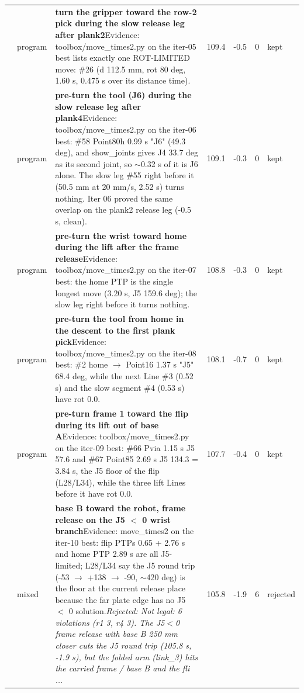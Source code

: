 {\begin{longtable}{>{\raggedleft}p{5mm} p{12mm} >{\raggedright}p{85mm} r r r p{14mm}}
6 & program & \textbf{turn the gripper toward the row-2 pick during the slow release leg after plank2}\newline Evidence: toolbox/move\_times2.py on the iter-05 best lists exactly one ROT-LIMITED move: \#26 (d 112.5 mm, rot 80 deg, 1.60 s, 0.475 s over its distance time). & 109.4 & -0.5 & 0 & kept \\
7 & program & \textbf{pre-turn the tool (J6) during the slow release leg after plank4}\newline Evidence: toolbox/move\_times2.py on the iter-06 best: \#58 Point80h 0.99 s "J6" (49.3 deg), and show\_joints gives J4 33.7 deg as its second joint, so $\sim$0.32 s of it is J6 alone. The slow leg \#55 right before it (50.5 mm at 20 mm/s, 2.52 s) turns nothing. Iter 06 proved the same overlap on the plank2 release leg (-0.5 s, clean). & 109.1 & -0.3 & 0 & kept \\
8 & program & \textbf{pre-turn the wrist toward home during the lift after the frame release}\newline Evidence: toolbox/move\_times2.py on the iter-07 best: the home PTP is the single longest move (3.20 s, J5 159.6 deg); the slow leg right before it turns nothing. & 108.8 & -0.3 & 0 & kept \\
9 & program & \textbf{pre-turn the tool from home in the descent to the first plank pick}\newline Evidence: toolbox/move\_times2.py on the iter-08 best: \#2 home $\to$ Point16 1.37 s "J5" 68.4 deg, while the next Line \#3 (0.52 s) and the slow segment \#4 (0.53 s) have rot 0.0. & 108.1 & -0.7 & 0 & kept \\
10 & program & \textbf{pre-turn frame 1 toward the flip during its lift out of base A}\newline Evidence: toolbox/move\_times2.py on the iter-09 best: \#66 Pvia 1.15 s J5 57.6 and \#67 Point85 2.69 s J5 134.3 = 3.84 s, the J5 floor of the flip (L28/L34), while the three lift Lines before it have rot 0.0. & 107.7 & -0.4 & 0 & kept \\
11 & mixed & \textbf{base B toward the robot, frame release on the J5 $<$ 0 wrist branch}\newline Evidence: move\_times2 on the iter-10 best: flip PTPs 0.65 + 2.76 s and home PTP 2.89 s are all J5-limited; L28/L34 say the J5 round trip (-53 $\to$ +138 $\to$ -90, $\sim$420 deg) is the floor at the current release place because the far plate edge has no J5 $<$ 0 solution.\newline \textit{Rejected: Not legal: 6 violations (r1 3, r4 3). The J5$<$0 frame release with base B 250 mm closer cuts the J5 round trip (105.8 s, -1.9 s), but the folded arm (link\_3) hits the carried frame / base B and the fli ...} & 105.8 & -1.9 & 6 & rejected \\

\end{longtable}}
